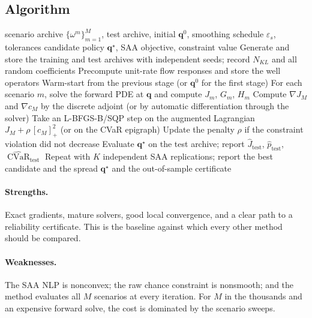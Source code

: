 \documentclass[11pt]{article}
\numberwithin{equation}{section}
\newcommand{\qq}{\mathbf{q}}
\newcommand{\CVaR}{\operatorname{CVaR}}
\theoremstyle{plain}
\begin{document}
\subsection{Algorithm}

\begin{algorithm}[htbp]
\caption{SAA with adjoint gradients and a smooth chance constraint}
\label{alg:saa}
\begin{algorithmic}[1]
\Require scenario archive $\{\omega^m\}_{m=1}^{M}$, test archive, initial
         $\qq^0$, smoothing schedule $\varepsilon_s$, tolerances
\Ensure candidate policy $\qq^\star$, SAA objective, constraint value
\State Generate and store the training and test archives with independent
       seeds; record $N_{KL}$ and all random coefficients
\State Precompute unit-rate flow responses and store the well operators
  \State Warm-start from the previous stage (or $\qq^0$ for the first stage)
  \Repeat
    \State For each scenario $m$, solve the forward PDE at $\qq$ and compute
           $J_m$, $G_m$, $H_m$
    \State Compute $\nabla J_M$ and $\nabla c_M$ by the discrete adjoint
           (or by automatic differentiation through the solver)
    \State Take an L-BFGS-B/SQP step on the augmented Lagrangian
           $J_M+\rho\,[c_M]_+^2$ (or on the CVaR epigraph)
    \State Update the penalty $\rho$ if the constraint violation did not
           decrease
\EndFor
\State Evaluate $\qq^\star$ on the test archive; report
       $\hat J_{\mathrm{test}}$, $\hat p_{\mathrm{test}}$,
       $\widehat{\CVaR}_{\mathrm{test}}$
\State Repeat with $K$ independent SAA replications; report the best
       candidate and the spread
\State \Return $\qq^\star$ and the out-of-sample certificate
\end{algorithmic}
\end{algorithm}

\paragraph{Strengths.}  Exact gradients, mature solvers, good local convergence,
and a clear path to a reliability certificate.  This is the baseline against
which every other method should be compared.

\paragraph{Weaknesses.}  The SAA NLP is nonconvex; the raw chance constraint is
nonsmooth; and the method evaluates all $M$ scenarios at every iteration.  For
$M$ in the thousands and an expensive forward solve, the cost is dominated by
the scenario sweeps.
\end{document}
